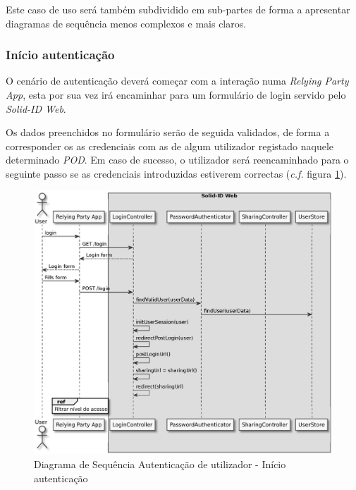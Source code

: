 Este caso de uso será também subdividido em sub-partes de forma a apresentar diagramas de sequência menos complexos e mais claros.

\subsubsection{Início autenticação}

O cenário de autenticação deverá começar com a interação numa \emph{Relying Party App}, esta por sua vez irá encaminhar para um formulário de login servido pelo \emph{Solid-ID Web}.

Os dados preenchidos no formulário serão de seguida validados, de forma a corresponder os as credenciais com as de algum utilizador registado naquele determinado \emph{POD}. Em caso de sucesso, o utilizador será reencaminhado para o seguinte passo se as credenciais introduzidas estiverem correctas (\emph{c.f.} figura \ref{autenticacao_sd1}).

\begin{figure}[H]
    \begin{center}
    \includegraphics[height=0.9 \textwidth]{figures/authentication_sd_1.eps}
    \caption{Diagrama de Sequência Autenticação de utilizador - Início autenticação}
        \label{autenticacao_sd1}
    \end{center}
\end{figure}

